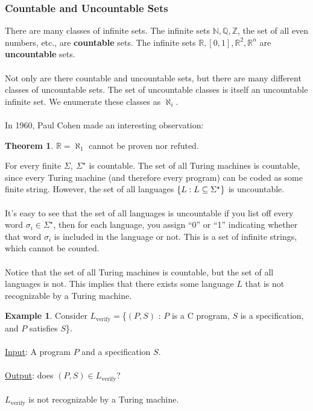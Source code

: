 \documentclass[]{article}
\DeclarePairedDelimiter{\set}{\lbrace}{\rbrace}
\theoremstyle{definition}
\newtheorem*{theorem}{Theorem}
\newtheorem{ex}{Example}[section]
\begin{document}
    \subsubsection{Countable and Uncountable Sets}
      There are many classes of infinite sets. The infinite sets $\mathbb{N}, \mathbb{Q}, \mathbb{Z}$, the set of all even numbers, etc., are \textbf{countable} sets. The infinite sets $\mathbb{R}, [0, 1], \mathbb{R}^2, \mathbb{R}^n$ are \textbf{uncountable} sets.
      \\ \\
      Not only are there countable and uncountable sets, but there are many different classes of uncountable sets. The set of uncountable classes is itself an uncountable infinite set. We enumerate these classes as $\aleph_i$.
      \\ \\
      In 1960, Paul Cohen made an interesting observation:
      \begin{theorem}
        $\mathbb{R} = \aleph_1$ cannot be proven nor refuted.
      \end{theorem}

      For every finite $\Sigma,~ \Sigma^\star$ is countable. The set of all Turing machines is countable, since every Turing machine (and therefore every program) can be coded as some finite string. However, the set of all languages $\set{L : L \subseteq \Sigma^\star}$ is uncountable.
      \\ \\
      It's easy to see that the set of all languages is uncountable if you list off every word $\sigma_i \in \Sigma^\star$, then for each language, you assign ``0'' or ``1'' indicating whether that word $\sigma_i$ is included in the language or not. This is a set of infinite strings, which cannot be counted.
      \\ \\
      Notice that the set of all Turing machines is countable, but the set of all languages is not. This implies that there exists some language $L$ that is not recognizable by a Turing machine.
      \begin{ex}
        Consider $L_\text{verify} = $\{$(P, S)$ : $P$ is a C program, $S$ is a specification, and $P$ satisfies $S$\}.
        \\ \\
        \underline{Input}: A program $P$ and a specification $S$.
        \\ \\
        \underline{Output}: does $(P, S) \in L_\text{verify}$?
        \\ \\
        $L_\text{verify}$ is not recognizable by a Turing machine.
      \end{ex}
\end{document}
